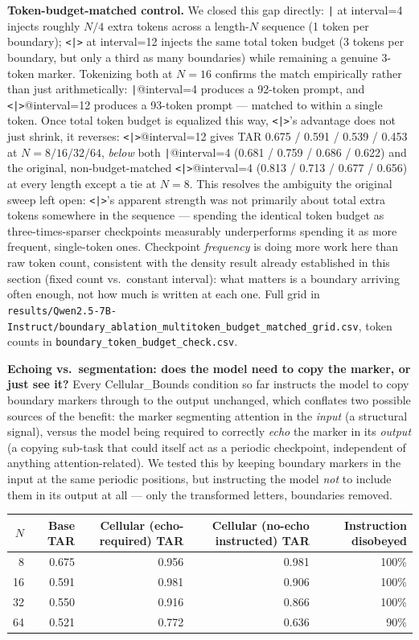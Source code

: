 \documentclass[11pt]{article}
\begin{document}
\textbf{Token-budget-matched control.} We closed this gap directly: \texttt{|} at interval=4 injects roughly $N/4$ extra tokens across a length-$N$ sequence (1 token per boundary); \texttt{<|>} at interval=12 injects the same total token budget (3 tokens per boundary, but only a third as many boundaries) while remaining a genuine 3-token marker. Tokenizing both at $N=16$ confirms the match empirically rather than just arithmetically: \texttt{|}@interval=4 produces a 92-token prompt, and \texttt{<|>}@interval=12 produces a 93-token prompt --- matched to within a single token. Once total token budget is equalized this way, \texttt{<|>}'s advantage does not just shrink, it reverses: \texttt{<|>}@interval=12 gives TAR 0.675 / 0.591 / 0.539 / 0.453 at $N=8/16/32/64$, \emph{below} both \texttt{|}@interval=4 (0.681 / 0.759 / 0.686 / 0.622) and the original, non-budget-matched \texttt{<|>}@interval=4 (0.813 / 0.713 / 0.677 / 0.656) at every length except a tie at $N=8$. This resolves the ambiguity the original sweep left open: \texttt{<|>}'s apparent strength was not primarily about total extra tokens somewhere in the sequence --- spending the identical token budget as three-times-sparser checkpoints measurably underperforms spending it as more frequent, single-token ones. Checkpoint \emph{frequency} is doing more work here than raw token count, consistent with the density result already established in this section (fixed count vs.\ constant interval): what matters is a boundary arriving often enough, not how much is written at each one. Full grid in \texttt{results/Qwen2.5-7B-Instruct/boundary\_ablation\_multitoken\_budget\_matched\_grid.csv}, token counts in \texttt{boundary\_token\_budget\_check.csv}.

\textbf{Echoing vs.\ segmentation: does the model need to copy the marker, or just see it?} Every Cellular\_Bounds condition so far instructs the model to copy boundary markers through to the output unchanged, which conflates two possible sources of the benefit: the marker segmenting attention in the \emph{input} (a structural signal), versus the model being required to correctly \emph{echo} the marker in its \emph{output} (a copying sub-task that could itself act as a periodic checkpoint, independent of anything attention-related). We tested this by keeping boundary markers in the input at the same periodic positions, but instructing the model \emph{not} to include them in its output at all --- only the transformed letters, boundaries removed.

\begin{table}[htbp]
\centering
\small
\begin{tabular}{rrrrr}
\toprule
$N$ & Base TAR & Cellular (echo-required) TAR & Cellular (no-echo instructed) TAR & Instruction disobeyed \\
\midrule
8  & 0.675 & 0.956 & 0.981 & 100\% \\
16 & 0.591 & 0.981 & 0.906 & 100\% \\
32 & 0.550 & 0.916 & 0.866 & 100\% \\
64 & 0.521 & 0.772 & 0.636 & 90\% \\
\bottomrule
\end{tabular}
\end{table}
\end{document}
